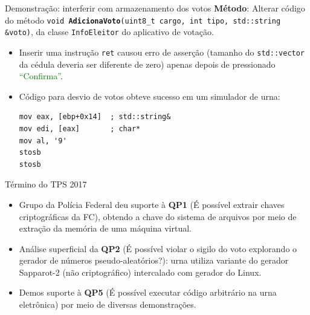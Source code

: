 \documentclass[10pt,xcolor={dvipsnames}]{beamer}
\begin{document}
\begin{frame}[fragile]{Demonstração: interferir com armazenamento dos votos}
  \textbf{Método}: Alterar código do método \alert{\texttt{\small void \textbf{AdicionaVoto}(uint8\_t cargo, int tipo, std::string \&voto)}}, da classe \alert{\texttt{\small InfoEleitor}} do aplicativo de votação.

  \vfill
  \begin{itemize}
    \item Inserir uma instrução \alert{\texttt{ret}} causou erro de asserção (tamanho do \texttt{\small std::vector} da cédula deveria ser diferente de zero) apenas depois de pressionado \textcolor{green}{``Confirma''}.\\[1em]

    \item Código para desvio de votos obteve sucesso em um simulador de urna:\\[0.5em]
    \begin{verbatim}
mov eax, [ebp+0x14]  ; std::string&
mov edi, [eax]       ; char*
mov al, '9'
stosb
stosb
    \end{verbatim}
  \end{itemize}
\end{frame}


\begin{frame}{Término do TPS 2017}
  \begin{itemize}
    \item Grupo da Polícia Federal deu suporte à \textbf{QP1} (É possível extrair chaves criptográficas da FC), obtendo a chave do sistema de arquivos por meio de extração da memória de uma máquina virtual.
    \item Análise superficial da \textbf{QP2} (É possível violar o sigilo do voto explorando o gerador de números pseudo-aleatórios?): urna utiliza variante do gerador Sapparot-2 (não criptográfico) intercalado com gerador do Linux.
    \item Demos suporte à \textbf{QP5} (É possível executar código arbitrário na
urna eletrônica) por meio de diversas demonstrações.
  \end{itemize}
\end{frame}
\end{document}
